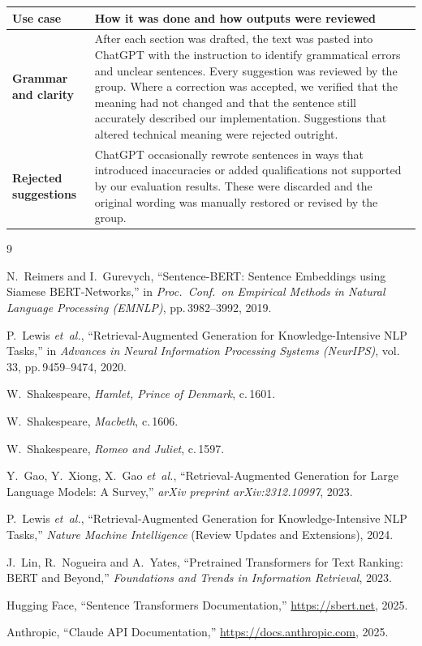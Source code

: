 \documentclass[10pt,conference]{IEEEtran}
\begin{document}
\vspace{6pt}
\noindent
\begin{tabularx}{\columnwidth}{>{\bfseries\small}p{2.4cm}X}
\toprule
\rowcolor{LightBlue}
Use case & How it was done and how outputs were reviewed \\
\midrule
Grammar and clarity &
After each section was drafted, the text was pasted into ChatGPT with
the instruction to identify grammatical errors and unclear sentences.
Every suggestion was reviewed by the group. Where a correction was
accepted, we verified that the meaning had not changed and that the
sentence still accurately described our implementation. Suggestions
that altered technical meaning were rejected outright.\\[4pt]
Rejected suggestions &
ChatGPT occasionally rewrote sentences in ways that introduced
inaccuracies or added qualifications not supported by our evaluation
results. These were discarded and the original wording was manually
restored or revised by the group.\\
\bottomrule
\end{tabularx}

\begin{thebibliography}{9}

N.~Reimers and I.~Gurevych,
``Sentence-BERT: Sentence Embeddings using Siamese BERT-Networks,''
in \textit{Proc.\ Conf.\ on Empirical Methods in Natural Language
Processing (EMNLP)}, pp.\,3982--3992, 2019.

P.~Lewis \textit{et~al.},
``Retrieval-Augmented Generation for Knowledge-Intensive NLP Tasks,''
in \textit{Advances in Neural Information Processing Systems
(NeurIPS)}, vol.\,33, pp.\,9459--9474, 2020.

W.~Shakespeare, \textit{Hamlet, Prince of Denmark}, c.\,1601.

W.~Shakespeare, \textit{Macbeth}, c.\,1606.

W.~Shakespeare, \textit{Romeo and Juliet}, c.\,1597.

Y.~Gao, Y.~Xiong, X.~Gao \textit{et~al.},
``Retrieval-Augmented Generation for Large Language Models: A Survey,''
\textit{arXiv preprint arXiv:2312.10997}, 2023.

P.~Lewis \textit{et~al.},
``Retrieval-Augmented Generation for Knowledge-Intensive NLP Tasks,''
\textit{Nature Machine Intelligence} (Review Updates and Extensions), 2024.

J.~Lin, R.~Nogueira and A.~Yates,
``Pretrained Transformers for Text Ranking: BERT and Beyond,''
\textit{Foundations and Trends in Information Retrieval}, 2023.

Hugging Face,
``Sentence Transformers Documentation,''
\url{https://sbert.net}, 2025.

Anthropic,
``Claude API Documentation,''
\url{https://docs.anthropic.com}, 2025.

\end{thebibliography}
\end{document}
